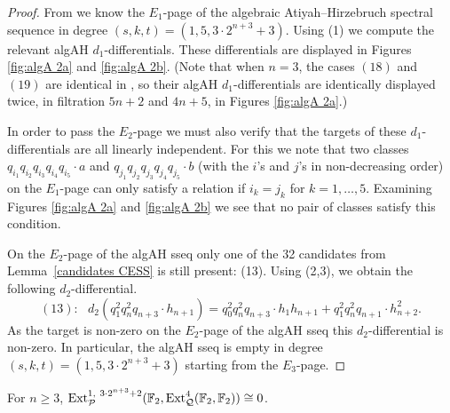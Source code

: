 \begin{proof}
  From  we know the $E_1$-page of the algebraic Atiyah--Hirzebruch spectral sequence in degree $(s,k,t) = (1,5,3 \cdot 2^{n+3} + 3)$. 
  Using (1) we compute the relevant algAH $d_1$-differentials.
  These differentials are displayed in Figures \ref{fig:algA 2a} and \ref{fig:algA 2b}.
  (Note that when $n=3$, the cases $(18)$ and $(19)$ are identical in , so their algAH $d_1$-differentials are identically displayed twice, in filtration $5n+2$ and $4n+5$, in Figures \ref{fig:algA 2a}.)
  
  In order to pass the $E_2$-page we must also verify that the targets of these $d_1$-differentials are all linearly independent.
  For this we note that two classes $q_{i_1}q_{i_2}q_{i_3}q_{i_4}q_{i_5} \cdot a$ and $q_{j_1}q_{j_2}q_{j_3}q_{j_4}q_{j_5} \cdot b$ (with the $i$'s and $j$'s in non-decreasing order) on the $E_1$-page can only satisfy a relation if $i_k = j_k$ for $k = 1,\dots,5$.
  Examining Figures \ref{fig:algA 2a} and \ref{fig:algA 2b} we see that no pair of classes satisfy this condition.

  On the $E_2$-page of the algAH sseq only one of the 32 candidates from Lemma~\ref{candidates CESS} is still present: (13). Using (2,3), we obtain the following $d_2$-differential.
$$(13): \ \ \  d_2(q_1^2q_{n}^2q_{n+3} \cdot h_{n+1})  = q_0^2q_n^2q_{n+3}\cdot h_1h_{n+1} + q_1^2q_n^2q_{n+1} \cdot h_{n+2}^2.$$
  As the target is non-zero on the $E_2$-page of the algAH sseq this $d_2$-differential is non-zero.
  In particular, the algAH sseq is empty in degree $(s,k,t) = (1,5,3 \cdot 2^{n+3} + 3)$ starting from the $E_3$-page.
\end{proof}

\begin{lem}  \label{lem:skt142}
For $n\geq 3$,  $\operatorname{\mathrm{Ext}}^{1,\ 3\cdot 2^{n+3} + 2}_{\mathcal{P}}(\operatorname{\mathbb{F}}_2, \operatorname{\mathrm{Ext}}_{\mathcal{Q}}^4(\operatorname{\mathbb{F}}_2, \operatorname{\mathbb{F}}_2)) \cong 0$.
\end{lem}

